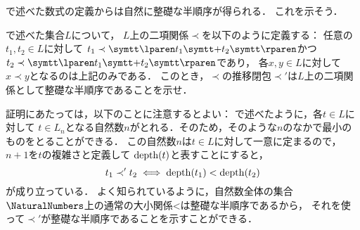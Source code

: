 
\begin{Que} \label{Que:well-foundedexample}
	で述べた数式の定義からは自然に整礎な半順序が得られる．
	これを示そう．

	で述べた集合\(L\)について，
	\(L\)上の二項関係\(\prec\)を以下のように定義する：
	任意の\(t_1, t_2 \in L\)に対して
	\(t_1 \prec \obj{\lparen} t_1 \obj{+} t_2 \obj{\rparen}\)かつ
	\(t_2 \prec \obj{\lparen} t_1 \obj{+} t_2 \obj{\rparen}\)であり，
	各\(x, y \in L\)に対して\(x \prec y\)となるのは上記のみである．
	このとき，\(\prec\)の推移閉包\(\prec'\)は\(L\)上の二項関係として整礎な半順序であることを示せ．

	証明にあたっては，以下のことに注意するとよい：
	で述べたように，各\(t \in L\)に対して
	\(t \in L_{n}\)となる自然数\(n\)がとれる．そのため，そのような\(n\)のなかで最小のものをとることができる．
	この自然数\(n\)は\(t \in L\)に対して一意に定まるので，\(n + 1\)を\(t\)の複雑さと定義して
	\(\apply{\depth}{t}\)と表すことにすると，
	\begin{equation}
		t_1 \prec' t_2 \metaequivalent \apply{\depth}{t_1} < \apply{\depth}{t_2}
		\label{eq:recursivedefinitiondepthorder}
	\end{equation}
	が成り立っている．
	よく知られているように，自然数全体の集合\(\NaturalNumbers\)上の通常の大小関係\(\mathord{<}\)は整礎な半順序であるから，
	それを使って\(\prec'\)が整礎な半順序であることを示すことができる．
\end{Que}

